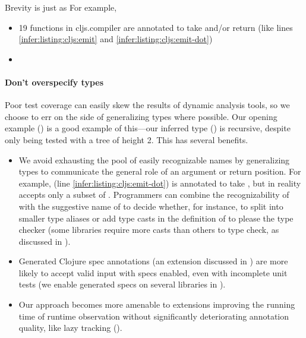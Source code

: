 Brevity is just as 
For example,
\begin{itemize}
  \item
    19 functions in cljs.compiler are annotated to take and/or return 
    (like lines \ref{infer:listing:cljs:emit} and \ref{infer:listing:cljs:emit-dot})
  \item
\end{itemize}

\paragraph{Don't overspecify types}
Poor test coverage can easily skew the results of dynamic analysis tools,
so we choose to err on the side of generalizing types
where possible.
Our opening example  ()
is a good example of this---our inferred type ()
is recursive, despite  only being tested with a tree of height 2.
This has several benefits.
\begin{itemize}
  \item We avoid exhausting the pool of easily recognizable names
    by generalizing types to communicate the general role
    of an argument or return position.
    For example,  (line \ref{infer:listing:cljs:emit-dot})
    is annotated to take , but in reality accepts only a subset
    of .
    Programmers can combine the recognizability of  with the
    suggestive name of  to decide whether, for instance,
    to split  into smaller type aliases
    or add type casts in the definition of  to please 
    the type checker
    (some libraries require more casts than others to type check, as discussed in ).
  \item Generated Clojure spec annotations (an extension discussed in )
        are more likely to accept valid input with specs enabled, even with incomplete unit tests
        (we enable generated specs on several libraries in ).
  \item Our approach becomes more amenable to extensions improving the running time
        of runtime observation without significantly deteriorating annotation quality,
        like lazy tracking ().
\end{itemize}

